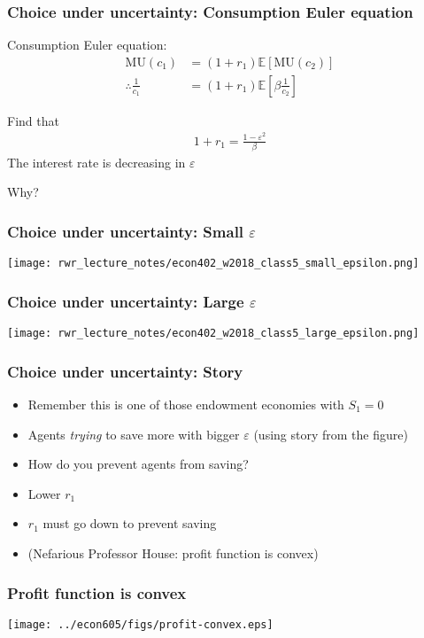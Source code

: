 \documentclass[presentation,dvipsnames]{beamer}
\begin{document}
\begin{frame}
\frametitle{Choice under uncertainty: Consumption Euler equation}
Consumption Euler equation:
\begin{align*}
\text{MU}(c_{1}) &= (1+r_{1}) \mathbb{E} \left[ \text{MU}(c_{2}) \right] \\
\therefore \frac{1}{c_{1}} &= (1+r_{1}) \mathbb{E} \left[ \beta \frac{1}{c_{2}} \right]
\end{align*}

Find that
\begin{align*}
1+r_{1} = \frac{1-\varepsilon^{2}}{\beta}
\end{align*}
\textcolor{RubineRed}{The interest rate is decreasing in $\varepsilon$}

\vspace{1em}

Why?
\end{frame}

\begin{frame}
\frametitle{Choice under uncertainty: Small $\varepsilon$}
\centerline{\texttt{[image: rwr\_lecture\_notes/econ402\_w2018\_class5\_small\_epsilon.png]}}
\end{frame}

\begin{frame}
\frametitle{Choice under uncertainty: Large $\varepsilon$}
\centerline{\texttt{[image: rwr\_lecture\_notes/econ402\_w2018\_class5\_large\_epsilon.png]}}
\end{frame}

\begin{frame}
\frametitle{Choice under uncertainty: Story}
\begin{itemize}[label={--}]
\item Remember this is one of those endowment economies with $S_{1} = 0$
\item Agents \emph{trying} to save more with bigger $\varepsilon$ (using story from the figure)
\item How do you prevent agents from saving?
\item Lower $r_{1}$
\item $r_{1}$ must go down to prevent saving
\item (Nefarious Professor House: profit function is convex)
\end{itemize}
\end{frame}

\begin{frame}
\frametitle{Profit function is convex}
\centerline{\texttt{[image: ../econ605/figs/profit-convex.eps]}}
\end{frame}
\end{document}
